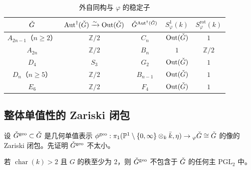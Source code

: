 \medskip
\begin{table}[htbp]
\centering
\caption{外自同构与 $\varphi$ 的稳定子}
\label{tab:2}
\small
\begin{tabular}{ccccc}
\toprule
$\check G$ & $\operatorname{Aut}^\dagger(\check G)\xrightarrow{\sim}\operatorname{Out}(\check G)$ & $\check G^{\operatorname{Aut}^\dagger(\check G)}$ & $S^1_\varphi(k)$ & $S^{\mathrm{rot}}_\varphi(k)$\\
\midrule
$A_{2n-1}$（$n\ge 2$） & $\mathbb{Z}/2$ & $C_n$ & $\operatorname{Out}(\check G)$ & $1$\\
$A_{2n}$ & $\mathbb{Z}/2$ & $B_n$ & $1$ & $\mathbb{Z}/2$\\
$D_4$ & $S_3$ & $G_2$ & $\operatorname{Out}(\check G)$ & $1$\\
$D_n$（$n\ge 5$） & $\mathbb{Z}/2$ & $B_{n-1}$ & $\operatorname{Out}(\check G)$ & $1$\\
$E_6$ & $\mathbb{Z}/2$ & $F_4$ & $\operatorname{Out}(\check G)$ & $1$\\
\bottomrule
\end{tabular}
\end{table}
\medskip

\subsection{整体单值性的 Zariski 闭包}

设 $\check G^{\mathrm{geo}}\subset\check G$ 是几何单值表示 $\phi^{\mathrm{geo}}:\pi_1(\mathbb{P}^1\setminus\{0,\infty\}\otimes_k\bar k,\eta)\to{}_\varphi\check G\cong\check G$ 的像的 Zariski 闭包。先证明 $\check G^{\mathrm{geo}}$ 不太小。

\begin{proposition}[B.~Gross]
若 $\operatorname{char}(k)>2$ 且 $G$ 的秩至少为 $2$，则 $\check G^{\mathrm{geo}}$ 不包含于 $\check G$ 的任何主 $\mathrm{PGL}_2$ 中。
\end{proposition}

